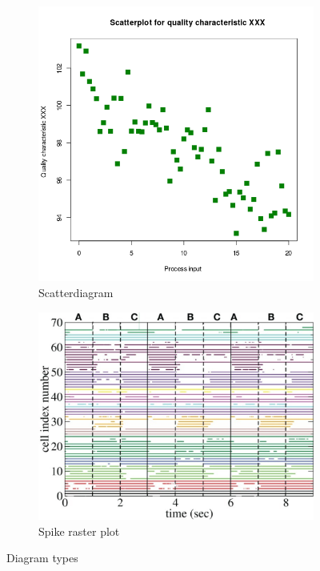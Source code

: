 \documentclass[twoside, english, draft]{Pflichtenheft}
\begin{document}
\begin{figure}[!h]
\begin{subfigure}[h]{0.475\textwidth}
            \includegraphics[width=\textwidth]{Images/Scatter_diagram.png}
            \caption[]%
            {{\small Scatterdiagram}}    
            \label{fig:Diagram types}
        \end{subfigure}
        \quad
        \begin{subfigure}[h]{0.475\textwidth}   
            \centering 
            \includegraphics[width=\textwidth]{Images/spike_raster_plot.png}
            \caption[]%
            {{\small Spike raster plot}}    
            \label{fig:mean and std of net44}
        \end{subfigure}
        \caption[ Diagram types ]
        {\small Diagram types} 
        \label{fig:Diagram types}
    \end{figure}
\vfill
\end{document}

